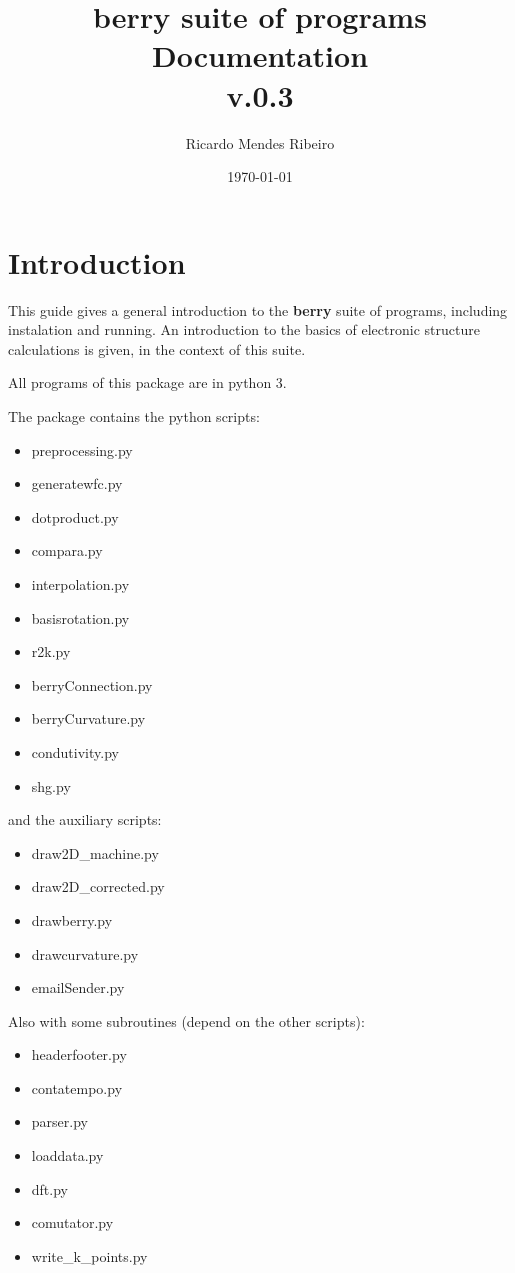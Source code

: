 \documentclass[a4paper,12pt]{report}
\title{{\bf berry} suite of programs\\
\large Documentation \\
v.0.3}
\author{Ricardo Mendes Ribeiro}
\date{\today}
\begin{document}
\maketitle
\tableofcontents

\chapter{Introduction}\label{ch:introduction}

 This guide gives a general introduction to the \textbf{berry} suite of programs, including instalation and running.
 An introduction to the basics of electronic structure calculations is given, in the context of this suite.

 All programs of this package are in python 3.

The package contains the python scripts:
\begin{itemize}
 \item preprocessing.py
 \item generatewfc.py
 \item dotproduct.py
 \item compara.py
 \item interpolation.py
 \item basisrotation.py
 \item r2k.py
 \item berryConnection.py
 \item berryCurvature.py
 \item condutivity.py
 \item shg.py
\end{itemize}\medskip

and the auxiliary scripts:
\begin{itemize}
 \item draw2D\_machine.py
 \item draw2D\_corrected.py
 \item drawberry.py
 \item drawcurvature.py
 \item emailSender.py
\end{itemize}\medskip

Also with some subroutines (depend on the other scripts):
\begin{itemize}
 \item headerfooter.py
 \item contatempo.py
 \item parser.py
 \item loaddata.py
 \item dft.py
 \item comutator.py
 \item write\_k\_points.py
\end{itemize}
\end{document}
